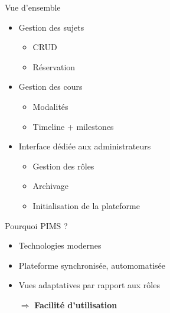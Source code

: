\documentclass[numbering=fraction,10pt]{beamer}
\begin{document}
\begin{frame}{Vue d'ensemble}
    \begin{itemize}
        \item Gestion des sujets
        \begin{itemize}
            \item CRUD
            \item Réservation
        \end{itemize} 
        \item Gestion des cours
        \begin{itemize}
            \item Modalités 
            \item Timeline + milestones
        \end{itemize}
        \item Interface dédiée aux administrateurs
        \begin{itemize}
            \item Gestion des rôles
            \item Archivage 
            \item Initialisation de la plateforme
        \end{itemize}
    \end{itemize}
\end{frame}


\begin{frame}{Pourquoi PIMS ?}
    \begin{itemize}
        \item Technologies modernes
        \item Plateforme synchronisée, automomatisée
        \item Vues adaptatives par rapport aux rôles
        \item[$\Longrightarrow$] \textbf{Facilité d'utilisation}
    \end{itemize}
\end{frame}
\end{document}
